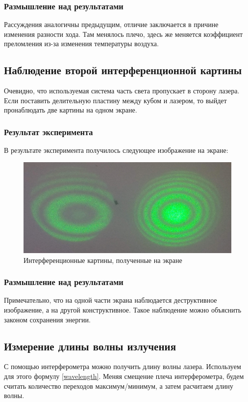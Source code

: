 \documentclass[%
reprint,
russian,
 amsmath,amssymb,
 aps,
]{revtex4-2}
\begin{document}
\subsubsection{Размышление над результатами}
Рассуждения аналогичны предыдущим, отличие заключается в причине изменения разности хода. Там менялось плечо, здесь же меняется коэффициент преломления из-за изменения температуры воздуха.
\subsection{Наблюдение второй интерференционной картины}
Очевидно, что используемая система часть света пропускает в сторону лазера. Если поставить делительную пластину между кубом и лазером, то выйдет пронаблюдать две картины на одном экране.
\subsubsection{Результат эксперимента}
В результате эксперимента получилось следующее изображение на экране:
\begin{figure}[h!]
\includegraphics[width=1\linewidth]{Interferention.png}
\caption{\label{fig:epsart}Интерференционные картины, полученные на экране}
\end{figure}
\subsubsection{Размышление над результатами}
Примечательно, что на одной части экрана наблюдается деструктивное изображение, а на другой конструктивное. Такое наблюдение можно объяснить законом сохранения энергии.
\subsection{Измерение длины волны излучения}
С помощью интерферометра можно получить длину волны лазера. Используем для этого формулу \ref{wavelength}. Меняя смещение плеча интерферометра, будем считать количество переходов максимум/минимум, а затем расчитаем длину волны. 
\end{document}
